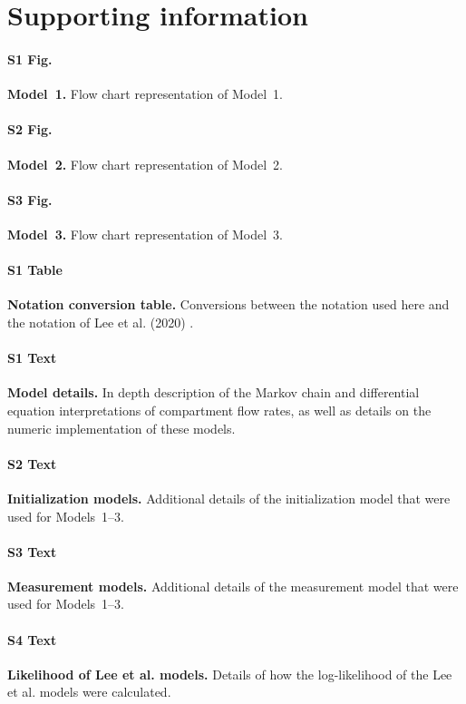 \documentclass[10pt,letterpaper]{article}\usepackage[]{graphicx}\usepackage[table]{xcolor}
\begin{document}
\section*{Supporting information}

\paragraph*{S1 Fig.}
\label{S_Mod1}
{\bf Model~1.} Flow chart representation of Model~1.

\paragraph*{S2 Fig.}
\label{S_Mod2}
{\bf Model~2.} Flow chart representation of Model~2.

\paragraph*{S3 Fig.}
\label{S_Mod3}
{\bf Model~3.} Flow chart representation of Model~3.

\paragraph*{S1 Table}
\label{S1_Table}
{\bf Notation conversion table.} Conversions between the notation used here and the notation of Lee et al. (2020) \cite{lee20}.

\paragraph*{S1 Text}
\label{S1_Text}
{\bf Model details.} In depth description of the Markov chain and differential equation interpretations of compartment flow rates, as well as details on the numeric implementation of these models.

\paragraph*{S2 Text}
\label{S_init}
{\bf Initialization models.} Additional details of the initialization model that were used for Models~1--3.

\paragraph*{S3 Text}
\label{S_meas}
{\bf Measurement models.} Additional details of the measurement model that were used for Models~1--3.

\paragraph*{S4 Text}
\label{S_lee20}
{\bf Likelihood of Lee et al. models.} Details of how the log-likelihood of the Lee et al. models were calculated.
\end{document}
